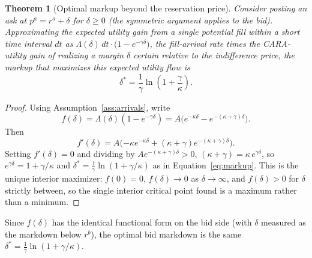 \documentclass[11pt]{article}
\newtheorem{theorem}{Theorem}
\theoremstyle{remark}
\theoremstyle{definition}
\begin{document}
\begin{theorem}[Optimal markup beyond the reservation price]
\label{thm:markup}
Consider posting an ask at $p^a = r^a+\delta$ for $\delta\ge0$ (the symmetric argument applies to the bid). Approximating the expected utility gain from a single potential fill within a short time interval $dt$ as $\Lambda(\delta)\,dt\cdot\big(1-e^{-\gamma\delta}\big)$, the fill-arrival rate times the CARA-utility gain of realizing a margin $\delta$ certain relative to the indifference price, the markup that maximizes this expected utility flow is
\begin{equation}
\delta^{*} = \frac{1}{\gamma}\ln\!\left(1+\frac{\gamma}{\kappa}\right).
\label{eq:markup}
\end{equation}
\end{theorem}
\begin{proof}
Using Assumption~\ref{ass:arrivals}, write
\begin{equation*}
f(\delta) = \Lambda(\delta)(1-e^{-\gamma\delta})
 = A\big(e^{-\kappa\delta}-e^{-(\kappa+\gamma)\delta}\big).
\end{equation*}
Then
\begin{equation*}
f'(\delta) = A\big({-\kappa}e^{-\kappa\delta}+(\kappa+\gamma)e^{-(\kappa+\gamma)\delta}\big).
\end{equation*}
Setting $f'(\delta)=0$ and dividing by $Ae^{-(\kappa+\gamma)\delta}>0$, $(\kappa+\gamma) = \kappa\,e^{\gamma\delta}$, so $e^{\gamma\delta} = 1+\gamma/\kappa$ and $\delta^{*}=\tfrac1\gamma\ln(1+\gamma/\kappa)$ as in Equation~\eqref{eq:markup}. This is the unique interior maximizer: $f(0)=0$, $f(\delta)\to0$ as $\delta\to\infty$, and $f(\delta)>0$ for $\delta$ strictly between, so the single interior critical point found is a maximum rather than a minimum.
\end{proof}

Since $f(\delta)$ has the identical functional form on the bid side (with $\delta$ measured as the markdown below $r^b$), the optimal bid markdown is the same $\delta^{*}=\tfrac1\gamma\ln(1+\gamma/\kappa)$.
\end{document}
